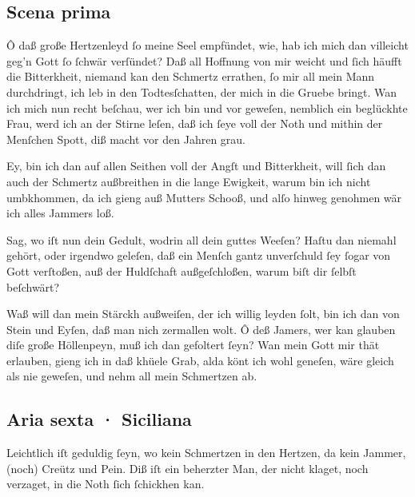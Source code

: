 \documentclass{ees}
\newenvironment{lyrics}[1]{%
  \subsection{#1}\nopagebreak%
  \begin{lyricslist}%
  \let\voice\item%
}{%
  \end{lyricslist}%
}
\begin{document}
\begin{lyrics}{Scena prima}
  \voice[Jobs Frau]
  Ô daß große Hertzenleyd
  ſo meine Seel empfündet,
  wie, hab ich mich dan villeicht
  geg’n Gott ſo ſchwär verſündet?
  Daß all Hoffnung von mir weicht
  und ſich häufft die Bitterkheit,
  niemand kan den Schmertz errathen,
  ſo mir all mein Mann durchdringt,
  ich leb in den Todtesſchatten,
  der mich in die Gruebe bringt.
  Wan ich mich nun recht beſchau,
  wer ich bin und vor geweſen,
  nemblich ein beglückhte Frau,
  werd ich an der Stirne leſen,
  daß ich ſeye voll der Noth
  und mithin der Menſchen Spott,
  diß macht vor den Jahren grau.

  \voice[Job]
  Ey, bin ich dan auf allen Seithen
  voll der Angſt und Bitterkheit,
  will ſich dan auch der Schmertz außbreithen
  in die lange Ewigkeit,
  warum bin ich nicht umbkhommen,
  da ich gieng auß Mutters Schooß,
  und alſo hinweg genohmen
  wär ich alles Jammers loß.

  \voice[Eliphas]
  Sag, wo iſt nun dein Gedult,
  wodrin all dein guttes Weeſen?
  Haſtu dan niemahl gehört,
  oder irgendwo geleſen,
  daß ein Menſch gantz unverſchuld
  ſey ſogar von Gott verſtoßen,
  auß der Huldſchaft außgeſchloßen,
  warum biſt dir ſelbſt beſchwärt?

  \voice[Job]
  Waß will dan mein Stärckh außweiſen,
  der ich willig leyden ſolt,
  bin ich dan von Stein und Eyſen,
  daß man nich zermallen wolt.
  Ô deß Jamers, wer kan glauben
  diſe große Höllenpeyn,
  muß ich dan gefoltert ſeyn?
  Wan mein Gott mir thät erlauben,
  gieng ich in daß khüele Grab,
  alda könt ich wohl geneſen,
  wäre gleich als nie geweſen,
  und nehm all mein Schmertzen ab.
\end{lyrics}

\begin{lyrics}{Aria sexta · Siciliana}
  \voice[Job]
  Leichtlich iſt geduldig ſeyn,
  wo kein Schmertzen
  in den Hertzen,
  da kein Jammer, (noch) Creütz und Pein.
  Diß iſt ein beherzter Man,
  der nicht klaget,
  noch verzaget,
  in die Noth ſich ſchickhen kan.
\end{lyrics}

\end{document}
